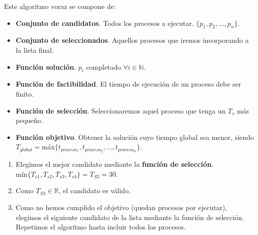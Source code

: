 \documentclass[12pt,spanish]{article}
\begin{document}
Este algoritmo voraz se compone de:
\begin{itemize}
	\item \textbf{Conjunto de candidatos}. Todos los procesos a ejecutar. $\{p_1, p_2, ..., p_n\}$.
	\item \textbf{Conjunto de seleccionados}. Aquellos procesos que iremos incorporando a la lista final.
	\item \textbf{Función solución}. $p_i$ completado $\forall i \in \mathbb{N}$.
	\item \textbf{Función de factibilidad}. El tiempo de ejecución de un proceso debe ser finito.
	\item \textbf{Función de selección}. Seleccionaremos aquel proceso que tenga un $T_s$ más pequeño.
	\item \textbf{Función objetivo}. Obtener la solución cuyo tiempo global sea menor, siendo $T_{global} =$máx$\{t_{proceso_1}, t_{proceso_2}, ... , t_{proceso_n}\}$.
\end{itemize}


\begin{enumerate}
	\item Elegimos el mejor candidato mediante la \textbf{función de selección}.\\
					mín$\{T_{s1}, T_{s2}, T_{s3}, T_{s4}\}=T_{S3}=30$.
	\item Como $T_{S3} \in \mathbb{R}$, el candidato es válido.
	\item Como no hemos cumplido el objetivo (quedan procesos por ejecutar), elegimos el siguiente candidato de la lista mediante la función de selección. Repetimos el algoritmo hasta incluir todos los procesos.
\end{enumerate}

\end{document}
